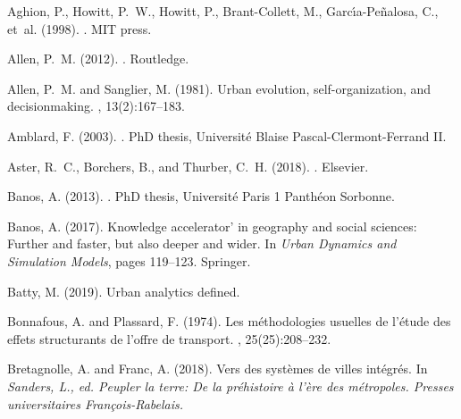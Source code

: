 \documentclass[10pt]{article}
\begin{document}
%
%


\begin{thebibliography}{}

Aghion, P., Howitt, P.~W., Howitt, P., Brant-Collett, M.,
  Garc{\'\i}a-Pe{\~n}alosa, C., et~al. (1998).
.
\newblock MIT press.

Allen, P.~M. (2012).
.
\newblock Routledge.

Allen, P.~M. and Sanglier, M. (1981).
\newblock Urban evolution, self-organization, and decisionmaking.
, 13(2):167--183.

Amblard, F. (2003).
.
\newblock PhD thesis, Universit{\'e} Blaise Pascal-Clermont-Ferrand II.

Aster, R.~C., Borchers, B., and Thurber, C.~H. (2018).
.
\newblock Elsevier.

Banos, A. (2013).
.
\newblock PhD thesis, Universit{\'e} Paris 1 Panth{\'e}on Sorbonne.

Banos, A. (2017).
\newblock Knowledge accelerator' in geography and social sciences: Further and
  faster, but also deeper and wider.
\newblock In {\em Urban Dynamics and Simulation Models}, pages 119--123.
  Springer.

Batty, M. (2019).
\newblock Urban analytics defined.

Bonnafous, A. and Plassard, F. (1974).
\newblock Les m{\'e}thodologies usuelles de l'{\'e}tude des effets structurants
  de l'offre de transport.
, 25(25):208--232.

Bretagnolle, A. and Franc, A. (2018).
\newblock Vers des syst{\`e}mes de villes int{\'e}gr{\'e}s.
\newblock In {\em Sanders, L., ed. Peupler la terre: De la pr{\'e}histoire à
  l'{\`e}re des m{\'e}tropoles. Presses universitaires François-Rabelais.}


\end{thebibliography}
\end{document}
